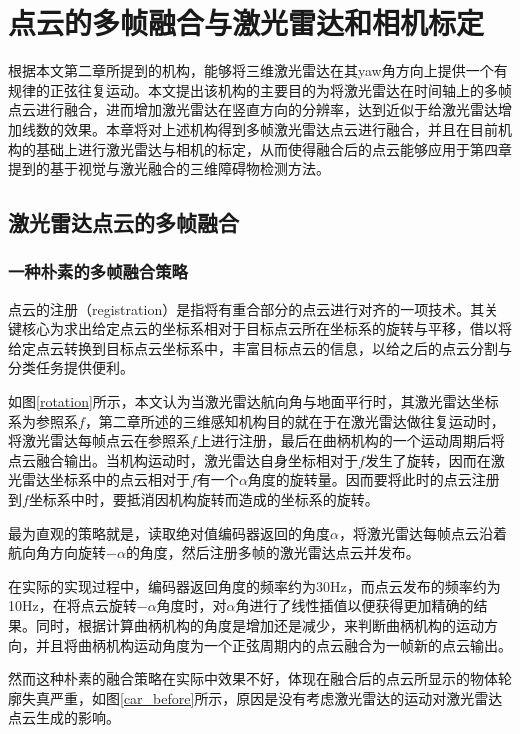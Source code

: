

\chapter{点云的多帧融合与激光雷达和相机标定}
根据本文第二章所提到的机构，能够将三维激光雷达在其yaw角方向上提供一个有规律的正弦往复运动。本文提出该机构的主要目的为将激光雷达在时间轴上的多帧点云进行融合，进而增加激光雷达在竖直方向的分辨率，达到近似于给激光雷达增加线数的效果。本章将对上述机构得到多帧激光雷达点云进行融合，并且在目前机构的基础上进行激光雷达与相机的标定，从而使得融合后的点云能够应用于第四章提到的基于视觉与激光融合的三维障碍物检测方法。

\section{激光雷达点云的多帧融合}

\subsection{一种朴素的多帧融合策略}
点云的注册（registration）是指将有重合部分的点云进行对齐的一项技术。其关键核心为求出给定点云的坐标系相对于目标点云所在坐标系的旋转与平移，借以将给定点云转换到目标点云坐标系中，丰富目标点云的信息，以给之后的点云分割与分类任务提供便利。


如图\ref{rotation}所示，本文认为当激光雷达航向角与地面平行时，其激光雷达坐标系为参照系$f$，第二章所述的三维感知机构目的就在于在激光雷达做往复运动时，将激光雷达每帧点云在参照系$f$上进行注册，最后在曲柄机构的一个运动周期后将点云融合输出。当机构运动时，激光雷达自身坐标相对于$f$发生了旋转，因而在激光雷达坐标系中的点云相对于$f$有一个$\alpha$角度的旋转量。因而要将此时的点云注册到$f$坐标系中时，要抵消因机构旋转而造成的坐标系的旋转。

最为直观的策略就是，读取绝对值编码器返回的角度$\alpha$，将激光雷达每帧点云沿着航向角方向旋转$-\alpha$的角度，然后注册多帧的激光雷达点云并发布。

在实际的实现过程中，编码器返回角度的频率约为30Hz，而点云发布的频率约为10Hz，在将点云旋转$-\alpha$角度时，对$\alpha$角进行了线性插值以便获得更加精确的结果。同时，根据计算曲柄机构的角度是增加还是减少，来判断曲柄机构的运动方向，并且将曲柄机构运动角度为一个正弦周期内的点云融合为一帧新的点云输出。

然而这种朴素的融合策略在实际中效果不好，体现在融合后的点云所显示的物体轮廓失真严重，如图\ref{car_before}所示，原因是没有考虑激光雷达的运动对激光雷达点云生成的影响。

